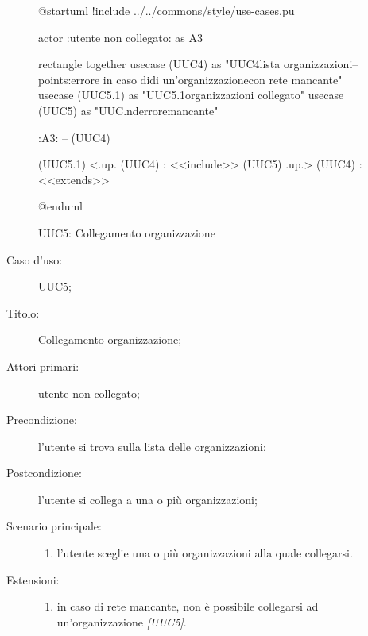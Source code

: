 \documentclass[../../../analisi-dei-requisiti.tex]{subfiles}
\begin{document}
\begin{figure}[H]
  \centering
  \begin{plantuml}
  @startuml
  !include ../../commons/style/use-cases.pu

  actor :utente non collegato: as A3

  rectangle {
    together {
      usecase (UUC4) as "UUC4\nRecupero lista organizzazioni\n--\nExtension points:\nVisualizzazione errore in caso di\nselezionamento di un'organizzazione\n con rete mancante"
      usecase (UUC5.1) as "UUC5.1\nFiltra organizzazioni \nnon collegato"
      usecase (UUC5) as "UUC.nd\nVisualizzazione errore\nrete mancante"
    }
  }

  :A3: -- (UUC4)

  (UUC5.1) <.up. (UUC4) : <<include>>
  (UUC5) .up.> (UUC4) : <<extends>>

  @enduml
  \end{plantuml}
  \caption{UUC5: Collegamento organizzazione}%
  \label{fig:uuc5}
\end{figure}

\begin{description}
  \item[Caso d’uso:] UUC5;
  \item[Titolo:] Collegamento organizzazione;
  \item[Attori primari:] utente non collegato;
  \item[Precondizione:] l'utente si trova sulla lista delle organizzazioni;
  \item[Postcondizione:] l'utente si collega a una o più organizzazioni;
  \item[Scenario principale:]
        \begin{enumerate}
          \item l'utente sceglie una o più organizzazioni alla quale collegarsi.
        \end{enumerate}
  \item[Estensioni:]
        \begin{enumerate}
          \item in caso di rete mancante, non è possibile collegarsi ad un'organizzazione \emph{[UUC5]}.
        \end{enumerate}
\end{description}
\end{document}
